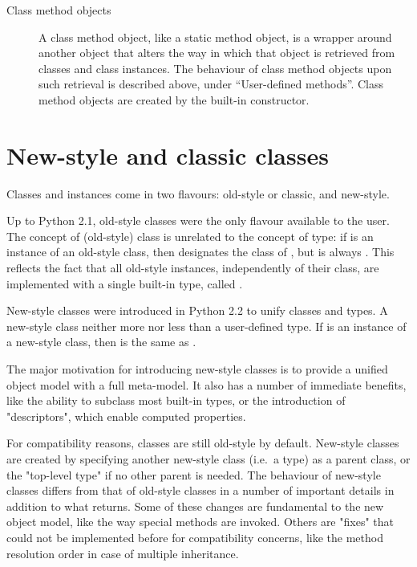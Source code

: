 \begin{description}
\begin{description}
\item[Class method objects]
A class method object, like a static method object, is a wrapper
around another object that alters the way in which that object
is retrieved from classes and class instances. The behaviour of
class method objects upon such retrieval is described above,
under ``User-defined methods''. Class method objects are created
by the built-in  constructor.

\end{description} %

\end{description} %

\section{New-style and classic classes}

Classes and instances come in two flavours: old-style or classic, and new-style.  

Up to Python 2.1, old-style classes were the only flavour available to the
user.  The concept of (old-style) class is unrelated to the concept of type: if
 is an instance of an old-style class, then 
designates the class of , but  is always .  This reflects the fact that all old-style instances,
independently of their class, are implemented with a single built-in type,
called .

New-style classes were introduced in Python 2.2 to unify classes and types.  A
new-style class neither more nor less than a user-defined type.  If  is
an instance of a new-style class, then  is the same as
.

The major motivation for introducing new-style classes is to provide a unified
object model with a full meta-model.  It also has a number of immediate
benefits, like the ability to subclass most built-in types, or the introduction
of "descriptors", which enable computed properties.

For compatibility reasons, classes are still old-style by default.  New-style
classes are created by specifying another new-style class (i.e.\ a type) as a
parent class, or the "top-level type"  if no other parent is
needed.  The behaviour of new-style classes differs from that of old-style
classes in a number of important details in addition to what 
returns.  Some of these changes are fundamental to the new object model, like
the way special methods are invoked.  Others are "fixes" that could not be
implemented before for compatibility concerns, like the method resolution order
in case of multiple inheritance.

